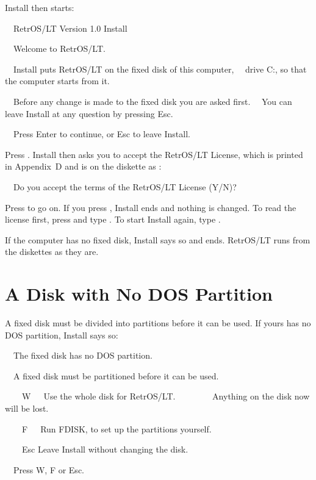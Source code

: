 Install then starts:

\begin{dialogue}
\ \ RetrOS/LT Version 1.0 Install

\ \ Welcome to RetrOS/LT.

\ \ Install puts RetrOS/LT on the fixed disk of this computer,
\ \ drive C:, so that the computer starts from it.

\ \ Before any change is made to the fixed disk you are asked first.
\ \ You can leave Install at any question by pressing Esc.

\ \ Press Enter to continue, or Esc to leave Install.
\end{dialogue}

Press . Install then asks you to accept the RetrOS/LT License,
which is printed in Appendix~D and is on the diskette as
:

\begin{dialogue}
\ \ Do you accept the terms of the RetrOS/LT License (Y/N)?
\end{dialogue}

Press  to go on. If you press , Install ends and nothing is
changed. To read the license first, press  and type
. To start Install again, type
.

If the computer has no fixed disk, Install says so and ends. RetrOS/LT
runs from the diskettes as they are.

\section{A Disk with No DOS Partition}

A fixed disk must be divided into partitions before it can be used. If
yours has no DOS partition, Install says so:

\begin{dialogue}
\ \ The fixed disk has no DOS partition.

\ \ A fixed disk must be partitioned before it can be used.

\ \ \ \ W\ \ \ Use the whole disk for RetrOS/LT.
\ \ \ \ \ \ \ \ Anything on the disk now will be lost.

\ \ \ \ F\ \ \ Run FDISK, to set up the partitions yourself.

\ \ \ \ Esc Leave Install without changing the disk.

\ \ Press W, F or Esc.
\end{dialogue}

